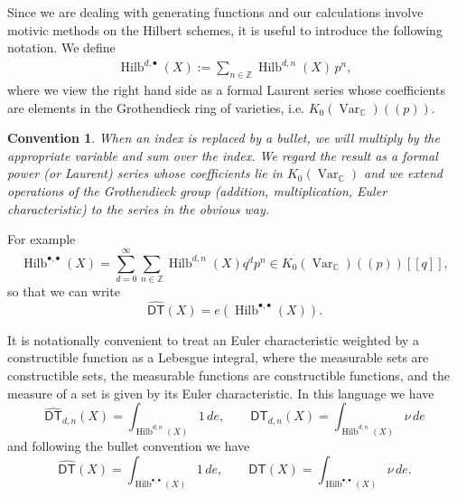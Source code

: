 \documentclass[12pt]{amsart}
\newtheorem{convention}{Convention}[theorem]
\theoremstyle{definition}
\newcommand{\CC} {\mathbb{C}}          %
\newcommand{\ZZ} {\mathbb{Z}}		%
\newcommand{\Hilb}{\operatorname{Hilb}}
\newcommand{\DT}{\mathsf{DT}}
\newcommand{\Var}{\operatorname{Var}}
\newcommand{\conn}{\operatorname{conn}}
\newcommand{\DThat}{\widehat{\DT}}
\begin{document}
\begin{comment}
The generating functions of interest are
\begin{align*}
\DT(X) &:= \sum_{d \geq 0} \DT_d(X) \, q^d := \sum_{d \geq 0} \sum_{n \in \ZZ} \DT_{d,n}(X) \, (-p)^n q^d, \\
\DThat (X) &:= \sum_{d \geq 0} \DThat _d(X) \, q^d := \sum_{d \geq 0} \sum_{n \in \ZZ} \DThat _{d,n}(X) \, p^n q^d.
\end{align*}
The corresponding connected series $\DT^{\conn}(X)$ and $\DThat ^{\conn}(X)$ are obtained after dividing by
\begin{align*}
&\sum_{d \geq 0} \sum_{n \in \ZZ} e(\Hilb^{dF,n}(X),\nu) \, (-p)^n q^d, \\
&\sum_{d \geq 0} \sum_{n \in \ZZ} e(\Hilb^{dF,n}(X)) \, p^n q^d,
\end{align*}
respectively.
\end{comment}

Since we are dealing with generating functions and our calculations
involve motivic methods on the Hilbert schemes, it is useful to
introduce the following notation. We define
\begin{align*}
\Hilb^{d,\bullet}(X) := \sum_{n \in \ZZ} \Hilb^{d,n}(X) \, p^n,
\end{align*}
where we view the right hand side as a formal Laurent series whose
coefficients are elements in the Grothendieck ring of varieties,
i.e. $K_0(\Var_{\CC})(\!(p)\!)$.



\begin{convention}\label{conv: bullet convention}
When an index is replaced by a bullet, we will multiply by the
appropriate variable and sum over the index. We regard the result as a
formal power (or Laurent) series whose coefficients lie in
$K_{0}(\Var_{\CC})$ and we extend operations of the Grothendieck group
(addition, multiplication, Euler characteristic) to the series in the
obvious way.
\end{convention}

For example
\[
\Hilb^{\bullet ,\bullet}(X) = \sum_{d=0}^{\infty}\sum_{n\in \ZZ}
\Hilb^{d,n}(X) q^{d}p^{n}\in K_{0}(\Var_{\CC})(\!(p)\!)[[q]],
\]
so that we can write
\[
\DThat (X) = e(\Hilb^{\bullet ,\bullet}(X)).
\]

It is notationally convenient to treat an Euler characteristic
weighted by a constructible function as a Lebesgue integral, where the
measurable sets are constructible sets, the measurable functions are
constructible functions, and the measure of a set is given by its
Euler characteristic. In this language we have
\[
\DThat_{d ,n}(X) =  \int_{\Hilb^{d ,n}(X)} 1\, de, \quad \quad
\DT_{d ,n}(X) = \int_{\Hilb^{d ,n}(X)} \nu \, de
\]
and following the bullet convention we have
\[
\DThat(X) =  \int_{\Hilb^{\bullet ,\bullet }(X)} 1\, de, \quad \quad
\DT(X) = \int_{\Hilb^{\bullet ,\bullet }(X)} \nu \, de.
\]
\end{document}
